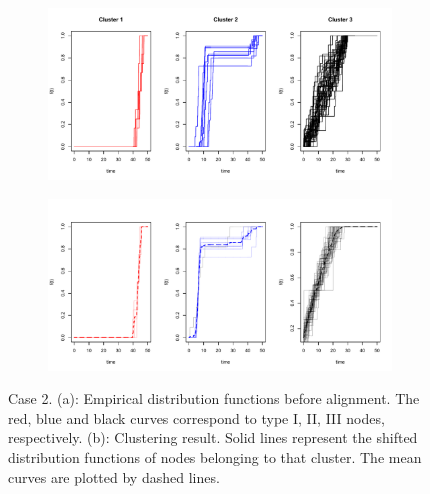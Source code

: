 \begin{figure}[H]
\begin{subfigure}{.8\textwidth}
\includegraphics[width=\linewidth]{../simulation/plots/f_list_2}
\caption{}
\label{fig: original curves, case 2}
\end{subfigure}
\begin{subfigure}{.8\textwidth}
\includegraphics[width=\linewidth]{../simulation/plots/clus_results_2}
\caption{}
\label{fig: aligned curves, case 2}
\end{subfigure}
\caption{Case 2. (a): Empirical distribution functions before alignment. The red, blue and black curves correspond to type I, II, III nodes, respectively. (b): Clustering result. Solid lines represent the shifted distribution functions of nodes belonging to that cluster. The mean curves are plotted by dashed lines. }
\end{figure}




